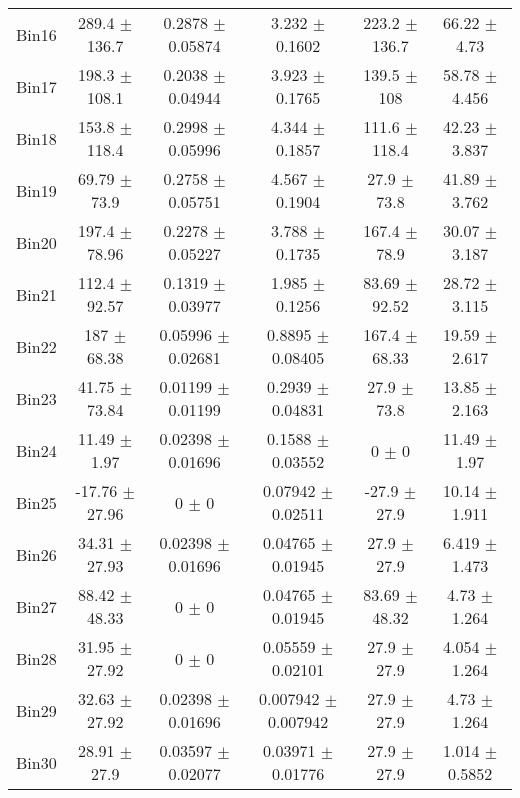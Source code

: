 \begin{tabular}{@{\extracolsep{4pt}}lccccc@{}}
     Bin16 & 289.4 $\pm$ 136.7 & 0.2878 $\pm$ 0.05874 & 3.232 $\pm$ 0.1602 & 223.2 $\pm$ 136.7 & 66.22 $\pm$ 4.73 \\ 
     Bin17 & 198.3 $\pm$ 108.1 & 0.2038 $\pm$ 0.04944 & 3.923 $\pm$ 0.1765 & 139.5 $\pm$ 108 & 58.78 $\pm$ 4.456 \\ 
     Bin18 & 153.8 $\pm$ 118.4 & 0.2998 $\pm$ 0.05996 & 4.344 $\pm$ 0.1857 & 111.6 $\pm$ 118.4 & 42.23 $\pm$ 3.837 \\ 
     Bin19 & 69.79 $\pm$ 73.9 & 0.2758 $\pm$ 0.05751 & 4.567 $\pm$ 0.1904 & 27.9 $\pm$ 73.8 & 41.89 $\pm$ 3.762 \\ 
     Bin20 & 197.4 $\pm$ 78.96 & 0.2278 $\pm$ 0.05227 & 3.788 $\pm$ 0.1735 & 167.4 $\pm$ 78.9 & 30.07 $\pm$ 3.187 \\ 
     Bin21 & 112.4 $\pm$ 92.57 & 0.1319 $\pm$ 0.03977 & 1.985 $\pm$ 0.1256 & 83.69 $\pm$ 92.52 & 28.72 $\pm$ 3.115 \\ 
     Bin22 & 187 $\pm$ 68.38 & 0.05996 $\pm$ 0.02681 & 0.8895 $\pm$ 0.08405 & 167.4 $\pm$ 68.33 & 19.59 $\pm$ 2.617 \\ 
     Bin23 & 41.75 $\pm$ 73.84 & 0.01199 $\pm$ 0.01199 & 0.2939 $\pm$ 0.04831 & 27.9 $\pm$ 73.8 & 13.85 $\pm$ 2.163 \\ 
     Bin24 & 11.49 $\pm$ 1.97 & 0.02398 $\pm$ 0.01696 & 0.1588 $\pm$ 0.03552 & 0 $\pm$ 0 & 11.49 $\pm$ 1.97 \\ 
     Bin25 & -17.76 $\pm$ 27.96 & 0 $\pm$ 0 & 0.07942 $\pm$ 0.02511 & -27.9 $\pm$ 27.9 & 10.14 $\pm$ 1.911 \\ 
     Bin26 & 34.31 $\pm$ 27.93 & 0.02398 $\pm$ 0.01696 & 0.04765 $\pm$ 0.01945 & 27.9 $\pm$ 27.9 & 6.419 $\pm$ 1.473 \\ 
     Bin27 & 88.42 $\pm$ 48.33 & 0 $\pm$ 0 & 0.04765 $\pm$ 0.01945 & 83.69 $\pm$ 48.32 & 4.73 $\pm$ 1.264 \\ 
     Bin28 & 31.95 $\pm$ 27.92 & 0 $\pm$ 0 & 0.05559 $\pm$ 0.02101 & 27.9 $\pm$ 27.9 & 4.054 $\pm$ 1.264 \\ 
     Bin29 & 32.63 $\pm$ 27.92 & 0.02398 $\pm$ 0.01696 & 0.007942 $\pm$ 0.007942 & 27.9 $\pm$ 27.9 & 4.73 $\pm$ 1.264 \\ 
     Bin30 & 28.91 $\pm$ 27.9 & 0.03597 $\pm$ 0.02077 & 0.03971 $\pm$ 0.01776 & 27.9 $\pm$ 27.9 & 1.014 $\pm$ 0.5852 \\ 
\hline\hline
  \end{tabular}
